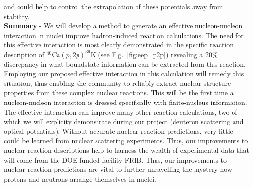 \documentclass[12pt]{article}
\begin{document}
and could help to control the extrapolation of these potentials away from stability. 
\\
\textbf{Summary}
 - We will develop a method to generate an effective nucleon-nucleon interaction in nuclei improve hadron-induced reaction calculations. The need for this effective interaction is
 most clearly demonstrated in the specific reaction description of $^{40}$Ca$(p,2p)^{39}$K (see Fig.~\ref{fig:eep_p2p}) revealing a 20\% discrepancy in what boundstate information
 can be extracted from this reaction. Employing our proposed effective interaction in this calculation will remedy this situation, thus enabling the community to reliably extract
 nuclear structure properties from these complex nuclear reactions. This will be the first time a nucleon-nucleon interaction is dressed specifically with finite-nucleus
 information. The effective interaction can improve many other reaction calculations, two of which we will explicity demonstrate during our project (deuteron scattering and optical
 potentials). Without accurate nuclear-reaction predictions, very little could be learned from nuclear scattering experiments. Thus, our improvements to nuclear-reaction
 descriptions help to harness the wealth of experimental data that will come from the DOE-funded facility FRIB.  Thus, our improvements to nuclear-reaction predictions are vital to
 further unravelling the mystery how protons and neutrons arrange themselves in nuclei.

%
   
   

   
\end{document}
